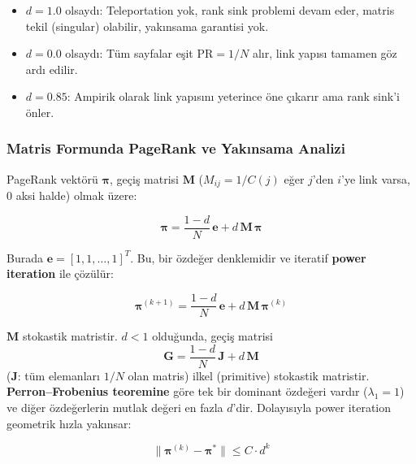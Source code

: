\begin{itemize}
  \item $d = 1.0$ olsayd{\i}: Teleportation yok, rank sink problemi devam eder, matris tekil (singular) olabilir, yak{\i}nsama garantisi yok.
  \item $d = 0.0$ olsayd{\i}: T\"{u}m sayfalar e\c{s}it $\text{PR} = 1/N$ al{\i}r, link yap{\i}s{\i} tamamen g\"{o}z ard{\i} edilir.
  \item $d = 0.85$: Ampirik olarak link yap{\i}s{\i}n{\i} yeterince \"{o}ne \c{c}{\i}kar{\i}r ama rank sink'i \"{o}nler.
\end{itemize}

\subsubsection{Matris Formunda PageRank ve Yak{\i}nsama Analizi}

PageRank vekt\"{o}r\"{u} $\boldsymbol{\pi}$, ge\c{c}i\c{s} matrisi $\mathbf{M}$ ($M_{ij} = 1/C(j)$ e\u{g}er $j$'den $i$'ye link varsa, $0$ aksi halde) olmak \"{u}zere:

\begin{equation}
\boldsymbol{\pi} = \frac{1-d}{N}\,\mathbf{e} + d\,\mathbf{M}\,\boldsymbol{\pi}
\label{eq:pagerank-matrix}
\end{equation}

\noindent
Burada $\mathbf{e} = [1, 1, \ldots, 1]^T$. Bu, bir \"{o}zde\u{g}er denklemidir ve iteratif \textbf{power iteration} ile \c{c}\"{o}z\"{u}l\"{u}r:

\begin{equation}
\boldsymbol{\pi}^{(k+1)} = \frac{1-d}{N}\,\mathbf{e} + d\,\mathbf{M}\,\boldsymbol{\pi}^{(k)}
\label{eq:power-iteration}
\end{equation}

\noindent
$\mathbf{M}$ stokastik matristir. $d < 1$ oldu\u{g}unda, ge\c{c}i\c{s} matrisi
\[
\mathbf{G} = \frac{1-d}{N}\,\mathbf{J} + d\,\mathbf{M}
\]
($\mathbf{J}$: t\"{u}m elemanlar{\i} $1/N$ olan matris) ilkel (primitive) stokastik matristir. \textbf{Perron--Frobenius teoremine} g\"{o}re tek bir dominant \"{o}zde\u{g}eri vard{\i}r ($\lambda_1 = 1$) ve di\u{g}er \"{o}zde\u{g}erlerin mutlak de\u{g}eri en fazla $d$'dir. Dolay{\i}s{\i}yla power iteration geometrik h{\i}zla yak{\i}nsar:

\begin{equation}
\|\boldsymbol{\pi}^{(k)} - \boldsymbol{\pi}^*\| \leq C \cdot d^k
\label{eq:convergence}
\end{equation}

